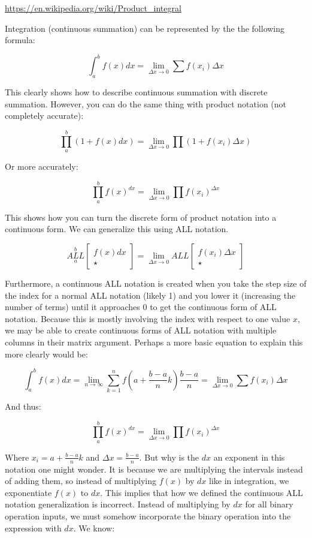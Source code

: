 \documentclass{article}
\begin{document}
\url{https://en.wikipedia.org/wiki/Product_integral}

Integration (continuous summation) can be represented by the the following formula:

$$\int_a^b f(x) dx = \underset{\Delta x \rightarrow 0}{\lim} \sum f(x_i) \Delta x$$

This clearly shows how to describe continuous summation with discrete summation. However, you can do the same thing with product notation (not completely accurate):

$$\prod_a^b(1+f(x) dx) =  \underset{\Delta x \rightarrow 0}{\lim} \prod (1 + f(x_i) \Delta x)$$

Or more accurately:

$$\prod_a^bf(x)^{dx} =  \underset{\Delta x \rightarrow 0}{\lim} \prod f(x_i)^{\Delta x}$$

This shows how you can turn the discrete form of product notation into a continuous form. We can generalize this using ALL notation.

$$\underset{a}{\overset{b}{ALL}} \begin{bmatrix}
f(x)dx \\
\star
\end{bmatrix}=\underset{\Delta x \rightarrow 0}{\lim} ALL \begin{bmatrix}
f(x_i)\Delta x \\
\star
\end{bmatrix}$$

Furthermore, a continuous ALL notation is created when you take the step size of the index for a normal ALL notation (likely 1) and you lower it (increasing the number of terms) until it approaches 0 to get the continuous form of ALL notation. Because this is mostly involving the index with respect to one value $x$, we may be able to create continuous forms of ALL notation with multiple columns in their matrix argument. Perhaps a more basic equation to explain this more clearly would be:

$$\int_a^b f(x) dx = \underset{n \rightarrow \infty}{\lim} \sum_{k=1}^{n} f(a+\frac{b-a}{n}k)\frac{b-a}{n}=\underset{\Delta x \rightarrow 0}{\lim} \sum f(x_i) \Delta x$$

And thus:

$$\prod_a^bf(x)^{dx} =  \underset{\Delta x \rightarrow 0}{\lim} \prod f(x_i)^{\Delta x}$$

Where $x_i = a+\frac{b-a}{n}k$ and $\Delta x = \frac{b-a}{n}$. But why is the $dx$ an exponent in this notation one might wonder. It is because we are multiplying the intervals instead of adding them, so instead of multiplying $f(x)$ by $dx$ like in integration, we exponentiate $f(x)$ to $dx$. This implies that how we defined the continuous ALL notation generalization is incorrect. Instead of multiplying by $dx$ for all binary operation inputs, we must somehow incorporate the binary operation into the expression with $dx$. We know:
\end{document}
